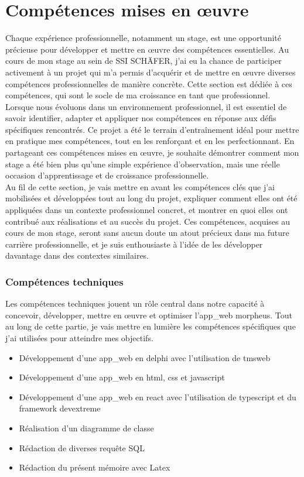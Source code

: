 \documentclass[a4paper, 12pt, french]{article}
\newcommand{\bdot}{\item[\color{ssiYellow}\ding{108}]}
\begin{document}
		\newpage

		\part{Compétences mises en \oe uvre}
			Chaque expérience professionnelle, notamment un stage, est une opportunité précieuse pour développer et mettre en œuvre des compétences essentielles. Au cours de mon stage au sein de SSI SCHÄFER, j'ai eu la chance de participer activement à un projet qui m'a permis d'acquérir et de mettre en œuvre diverses compétences professionnelles de manière concrète. Cette section est dédiée à ces compétences, qui sont le socle de ma croissance en tant que professionnel.\\

			Lorsque nous évoluons dans un environnement professionnel, il est essentiel de savoir identifier, adapter et appliquer nos compétences en réponse aux défis spécifiques rencontrés. Ce projet a été le terrain d'entraînement idéal pour mettre en pratique mes compétences, tout en les renforçant et en les perfectionnant. En partageant ces compétences mises en œuvre, je souhaite démontrer comment mon stage a été bien plus qu'une simple expérience d'observation, mais une réelle occasion d'apprentissage et de croissance professionnelle.\\

			Au fil de cette section, je vais mettre en avant les compétences clés que j'ai mobilisées et développées tout au long du projet, expliquer comment elles ont été appliquées dans un contexte professionnel concret, et montrer en quoi elles ont contribué aux réalisations et au succès du projet. Ces compétences, acquises au cours de mon stage, seront sans aucun doute un atout précieux dans ma future carrière professionnelle, et je suis enthousiaste à l'idée de les développer davantage dans des contextes similaires.

			\section{Compétences techniques}
				Les compétences techniques jouent un rôle central dans notre capacité à concevoir, développer, mettre en œuvre et optimiser l'\gls{app_web} morpheus. Tout au long de cette partie, je vais mettre en lumière les compétences spécifiques que j'ai utilisées pour atteindre mes objectifs.
				\begin{itemize}
					\bdot{Développement d'une \gls{app_web} en \gls{delphi} avec l'utilisation de \gls{tmsweb}}
					\bdot{Développement d'une \gls{app_web} en \gls{html}, \gls{css} et \gls{javascript}}
					\bdot{Développement d'une \gls{app_web} en \gls{react} avec l'utilisation de typescript et du \gls{framework} \gls{devextreme}}
					\bdot{Réalisation d'un diagramme de classe}
					\bdot{Rédaction de diverses requête SQL}
					\bdot{Rédaction du présent mémoire avec Latex}
				\end{itemize}		
			
\end{document}
